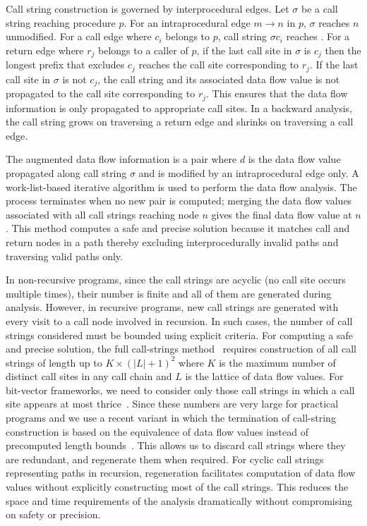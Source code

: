 \documentclass{llncs}
\newcommand{\callpt}[1]{\mbox{$c_{#1}$}}
\newcommand{\retpt}[1]{\mbox{$r_{#1}$}}
\newcommand{\End}[1]{\text{{\sf\em end}$_{#1}$}\xspace}
\newcommand{\Start}[1]{\text{{\sf\em start}$_{#1}$}\xspace}
\begin{document}
Call string construction is governed by interprocedural edges. 
Let $\sigma$ be a call string reaching procedure $p$. For
an intraprocedural edge $m\rightarrow n$ in $p$, $\sigma$ reaches $n$
unmodified. For a call edge \text{$\callpt{i}\rightarrow\Start{q}$}
where \callpt{i} belongs to $p$, call string $\sigma c_i$ reaches
\Start{q}. For a return edge \text{$\End{p}\rightarrow \retpt{j}$} where
\retpt{j} belongs to a caller of $p$, if the last call site in $\sigma$
is $c_j$ then the longest prefix that excludes $c_j$ reaches the call
site corresponding to \retpt{j}. If the last call site in $\sigma$ is
not $c_j$, the call string and its associated data flow value is not
propagated to the call site corresponding to \retpt{j}. This ensures
that the data flow information is only propagated to appropriate call sites.
In a backward analysis, the call string grows on traversing a return
edge and shrinks on traversing a call edge.


The augmented data flow information is a pair  where $d$ is the data flow value propagated along call
string $\sigma$ and is modified by an intraprocedural edge only. A
work-list-based iterative algorithm is used to perform the data flow
analysis. The process terminates when no new pair  is computed; merging the data flow values associated with
all call strings reaching node $n$ gives the final data flow value at
$n$. This method computes a safe and precise solution because it matches
call and return nodes in a path thereby excluding interprocedurally
invalid paths and traversing valid paths only.

In non-recursive programs, since the call strings are acyclic (no call
site occurs multiple times),
their number is finite and all of them are generated during analysis.
However, in recursive programs, new call strings are generated with every
visit to a call node involved in recursion. In such cases, the
number of call strings considered must be bounded using explicit criteria.
For computing a safe and precise solution, the full call-strings
method~\cite{Sharir.M.Pnueli.A:1981:Two-Approaches-to}
requires construction of all call strings of length up to $K \times
(|L|+1)^2$ where $K$ is the maximum number of distinct call sites in any
call chain and $L$ is the lattice of data flow values. For bit-vector
frameworks, we need to consider only those call strings in which a call
site appears at most
thrice~\cite{Karkare.B.Khedker.UP:2007:Improved-Bound-for}.
Since these numbers are very large for practical programs and we use
a recent variant in which the termination of call-string construction is based
on the equivalence of data flow values instead of precomputed length
bounds~\cite{Khedker.UP.Karkare.B:2008:Efficiency-Precision-Simplicity,Khedker.U.Sanyal.A.Karkare.B:2009:Data-Flow-Analysis}.
This allows us to discard call strings where they are redundant, and
regenerate them when required. For cyclic call strings representing
paths in recursion,
regeneration facilitates computation of data flow values
without explicitly constructing most of the call strings. This reduces
the space and time requirements of the analysis dramatically without
compromising on safety or precision.
\end{document}
